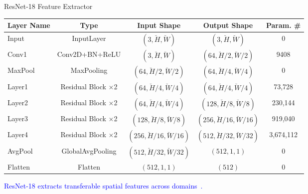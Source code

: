 \documentclass[aspectratio=169]{beamer}
\let\oldcite\cite %
\renewcommand{\cite}[1]{{\tiny\oldcite{#1}}}
\begin{document}




\begin{frame}{ResNet-18 Feature Extractor}
\begin{table}
\begin{tabularx}{\linewidth}{lcccc}
\toprule
\textbf{Layer Name} & \textbf{Type} & \textbf{Input Shape} & \textbf{Output Shape} & \textbf{Param. \#} \\
\midrule
Input & InputLayer & $(3, \breve{H}, \breve{W})$ & $(3, \breve{H}, \breve{W})$ & 0 \\
Conv1 & Conv2D+BN+ReLU & $(3, \breve{H}, \breve{W})$ & $(64, \breve{H}/2, \breve{W}/2)$ & 9408 \\
MaxPool & MaxPooling & $(64, \breve{H}/2, \breve{W}/2)$ & $(64, \breve{H}/4, \breve{W}/4)$ & 0 \\
Layer1 & Residual Block $\times$2 & $(64, \breve{H}/4, \breve{W}/4)$ & $(64, \breve{H}/4, \breve{W}/4)$ & 73,728 \\
Layer2 & Residual Block $\times$2 & $(64, \breve{H}/4, \breve{W}/4)$ & $(128, \breve{H}/8, \breve{W}/8)$ & 230,144 \\
Layer3 & Residual Block $\times$2 & $(128, \breve{H}/8, \breve{W}/8)$ & $(256, \breve{H}/16, \breve{W}/16)$ & 919,040 \\
Layer4 & Residual Block $\times$2 & $(256, \breve{H}/16, \breve{W}/16)$ & $(512, \breve{H}/32, \breve{W}/32)$ & 3,674,112 \\
AvgPool & GlobalAvgPooling & $(512, \breve{H}/32, \breve{W}/32)$ & $(512, 1, 1)$ & 0 \\
Flatten & Flatten & $(512,1,1)$ & $(512)$ & 0 \\
\bottomrule
\end{tabularx}
\end{table}
\begin{center}
    \textcolor{blue}{ResNet-18 extracts transferable spatial features across domains~\cite{diagnostics11061071}.}
\end{center}
\end{frame}
\end{document}
